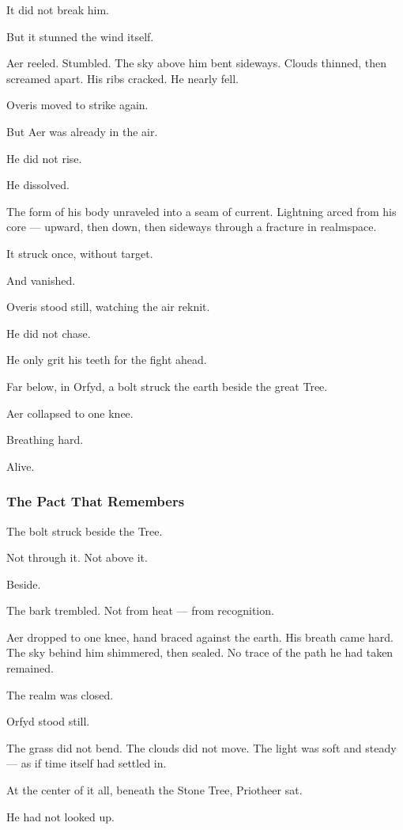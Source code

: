 \documentclass[12pt]{article}
\begin{document}
It did not break him.

But it stunned the wind itself.

Aer reeled. Stumbled. The sky above him bent sideways. Clouds thinned, then screamed apart. His ribs cracked. He nearly fell.

Overis moved to strike again.

But Aer was already in the air.

He did not rise.

He dissolved.

The form of his body unraveled into a seam of current. Lightning arced from his core — upward, then down, then sideways through a fracture in realmspace.

It struck once, without target.

And vanished.

Overis stood still, watching the air reknit.

He did not chase.

He only grit his teeth for the fight ahead.

Far below, in Orfyd, a bolt struck the earth beside the great Tree.

Aer collapsed to one knee.

Breathing hard.

Alive.


\dotfill

\subsubsection*{The Pact That Remembers}

The bolt struck beside the Tree.

Not through it. Not above it.

Beside.

The bark trembled. Not from heat — from recognition.

Aer dropped to one knee, hand braced against the earth. His breath came hard. The sky behind him shimmered, then sealed. No trace of the path he had taken remained.

The realm was closed.

Orfyd stood still.

The grass did not bend. The clouds did not move. The light was soft and steady — as if time itself had settled in.

At the center of it all, beneath the Stone Tree, Priotheer sat.

He had not looked up.
\end{document}
